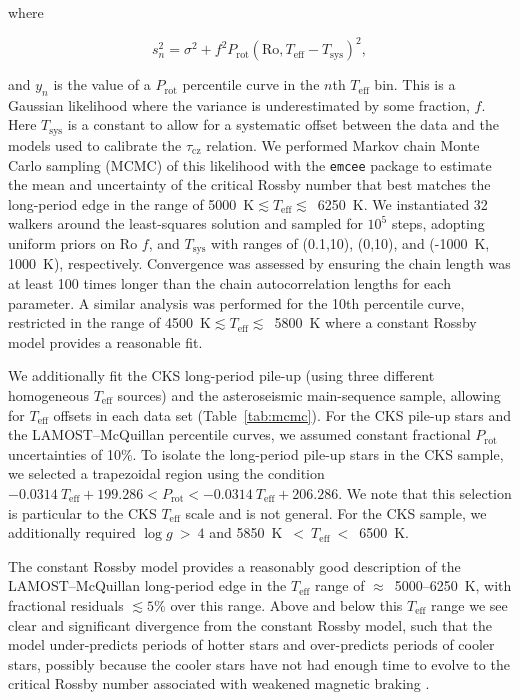 \documentclass[trackchanges,twocolumn]{aastex631}
\newcommand{\taucz}{$\tau_\mathrm{cz}$\xspace}
\newcommand{\lamostmcq}{LAMOST--McQuillan\xspace}
\newcommand{\teff}{\ensuremath{T_{\mathrm{eff}}}\xspace}
\newcommand{\logg}{\ensuremath{\log g}\xspace}
\newcommand{\prot}{\ensuremath{P_\mathrm{rot}}\xspace}
\begin{document}
where

\begin{equation} \label{eq:4}
    s_n^2 = \sigma^2 + f^2 P_\mathrm{rot}(\mathrm{Ro}, T_\mathrm{eff} - T_\mathrm{sys})^2,
\end{equation}


and $y_n$ is the value of a \prot percentile curve in the $n$th \teff bin. This is a Gaussian likelihood where the variance is underestimated by some fraction, $f$. Here $T_\mathrm{sys}$ is a constant to allow for a systematic offset between the data and the models used to calibrate the \taucz relation. We performed Markov chain Monte Carlo sampling (MCMC) of this likelihood with the \texttt{emcee} package \citep{emcee2013, emcee2019} to estimate the mean and uncertainty of the critical Rossby number that best matches the long-period edge in the range of 5000~K$\lesssim \teff \lesssim$~6250~K. We instantiated 32 walkers around the least-squares solution and sampled for $10^5$ steps, adopting uniform priors on Ro $f$, and $T_\mathrm{sys}$ with ranges of (0.1,10), (0,10), and (-1000~K, 1000~K), respectively. Convergence was assessed by ensuring the chain length was at least 100 times longer than the chain autocorrelation lengths for each parameter. A similar analysis was performed for the 10th percentile curve, restricted in the range of 4500~K$\lesssim \teff \lesssim$~5800~K where a constant Rossby model provides a reasonable fit. 

We additionally fit the CKS long-period pile-up (using three different homogeneous \teff sources) and the \citet{Hall2021} asteroseismic main-sequence sample, allowing for \teff offsets in each data set (Table~\ref{tab:mcmc}). For the CKS pile-up stars and the \lamostmcq percentile curves, we assumed constant fractional \prot uncertainties of 10\%. To isolate the long-period pile-up stars in the CKS sample, we selected a trapezoidal region using the condition $-0.0314~\teff + 199.286 < \prot < -0.0314~\teff + 206.286$. We note that this selection is particular to the CKS \teff scale and is not general. For the CKS sample, we additionally required $\logg~>~4$ and 5850~K~$<~\teff~<$~6500~K. 

The constant Rossby model provides a reasonably good description of the \lamostmcq long-period edge in the \teff range of $\approx$~5000--6250~K, with fractional residuals $\lesssim5\%$ over this range. Above and below this \teff range we see clear and significant divergence from the constant Rossby model, such that the model under-predicts periods of hotter stars and over-predicts periods of cooler stars, possibly because the cooler stars have not had enough time to evolve to the critical Rossby number associated with weakened magnetic braking \citep[see Figure 6 in][]{vanSaders2019}.
\end{document}
